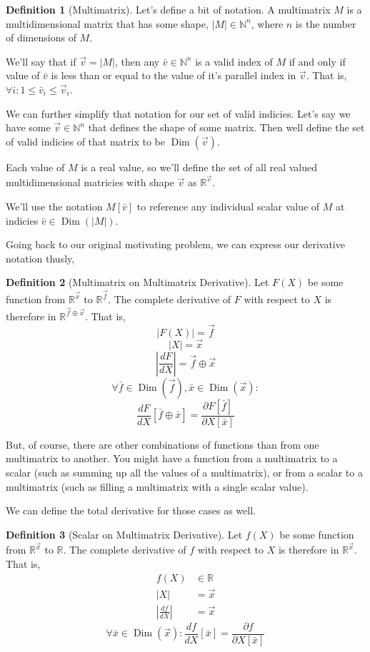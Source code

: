 \documentclass[12pt]{article}
\theoremstyle{definition}
\newtheorem{definition}{Definition}[section]
\theoremstyle{case}
\theoremstyle{ppart}
\DeclareMathOperator{\Dim}{Dim}
\begin{document}
\begin{definition}[Multimatrix]
Let's define a bit of notation. A multimatrix $M$ is a multidimensional matrix
that has some shape, $|M| \in \mathbb{N}^n$, where $n$ is the number of
dimensions of $M$.

We'll say that if $\vec{v} = |M|$, then any $\bar{v} \in \mathbb{N}^n$ is a valid
index of $M$ if and only if value of $\bar{v}$ is less than or equal to the value
of it's parallel index in $\vec{v}$. That is, $\forall i: 1 \le \bar{v}_i \le \vec{v}_i$.

We can further simplify that notation for our set of valid indicies. Let's say we have
some $\vec{v} \in \mathbb{N}^n$ that defines the shape of some matrix. Then well
define the set of valid indicies of that matrix to be $\Dim(\vec{v})$. 

Each value of $M$ is a real value, so we'll define the set of all real valued
multidimensional matricies with shape $\vec{v}$ as $\mathbb{R}^{\vec{v}}$.

We'll use the notation $M[\bar{v}]$ to reference any individual scalar value of $M$
at indicies $\bar{v} \in \Dim(|M|)$. 
\end{definition}

Going back to our original motivating problem, we can express our derivative
notation thusly,

\begin{definition}[Multimatrix on Multimatrix Derivative]
\label{mm_derivative}
Let $F(X)$ be some function from $\mathbb{R}^{\vec{x}}$ to $\mathbb{R}^{\vec{f}}$.
The complete derivative of $F$ with respect to $X$ is therefore in
$\mathbb{R}^{\vec{f} \oplus \vec{x}}$. That is,
\[ |F(X)| = \vec{f} \]
\[ |X| = \vec{x} \]
\[ \left|\frac{dF}{dX}\right| = \vec{f} \oplus \vec{x} \]
\[
\forall \bar{f} \in \Dim(\vec{f}),
        \bar{x} \in \Dim(\vec{x}):
\]
\[
\frac{dF}{dX}[\bar{f} \oplus \bar{x}] =
\frac{\partial F[\bar{f}]}{\partial X[\bar{x}]}
\]
\end{definition}

But, of course, there are other combinations of functions than from one
multimatrix to another. You might have a function from a multimatrix to a
scalar (such as summing up all the values of a multimatrix), or from a scalar
to a multimatrix (such as filling a multimatrix with a single scalar value).

We can define the total derivative for those cases as well.

\begin{definition}[Scalar on Multimatrix Derivative]
\label{sm_derivative}
Let $f(X)$ be some function from $\mathbb{R}^{\vec{x}}$ to $\mathbb{R}$.
The complete derivative of $f$ with respect to $X$ is therefore in
$\mathbb{R}^{\vec{x}}$. That is,
\begin{align*}
f(X) &\in \mathbb{R} \\
|X| &= \vec{x} \\
\left|\frac{df}{dX}\right| &= \vec{x}
\end{align*}
\[
\forall \bar{x} \in \Dim(\vec{x}):
        \frac{df}{dX}[\bar{x}] =
        \frac{\partial f}{\partial X[\bar{x}]}
\]
\end{definition}
\end{document}
